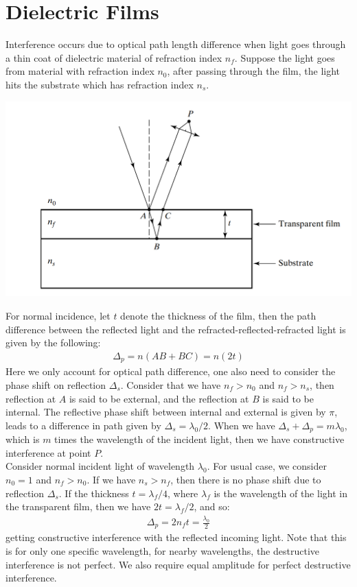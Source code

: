\documentclass[11pt]{book}
\theoremstyle{break}
\theoremstyle{break}
\begin{document}
\section[Dielectric Films]{\color{red}Dielectric Films\color{black}}
Interference occurs due to optical path length difference when light goes through a thin coat of dielectric material of refraction index $n_f$. Suppose the light goes from material with refraction index $n_0$, after passing through the film, the light hits the substrate which has refraction index $n_s$. \\
\begin{center}
\includegraphics[scale=0.39]{film.png}
\end{center}
For normal incidence, let $t$ denote the thickness of the film, then the path difference between the reflected light and the refracted-reflected-refracted light is given by the following:
\begin{align*}
\Delta_p = n(AB+BC) = n(2t)
\end{align*}
Here we only account for optical path difference, one also need to consider the phase shift on reflection $\Delta_s$. Consider that we have $n_f > n_0$ and $n_f > n_s$, then reflection at $A$ is said to be external, and the reflection at $B$ is said to be internal. The reflective phase shift between internal and external is given by $\pi$, leads to a difference in path given by $\Delta_s = \lambda_0/ 2$. When we have $\Delta_s+ \Delta_p = m\lambda_0$, which is $m$ times the wavelength of the incident light, then we have constructive interference at point $P$.\\

Consider normal incident light of wavelength $\lambda_0$. For usual case, we consider $n_0 = 1$ and $n_f > n_0$. If we have $n_s > n_f$, then there is no phase shift due to reflection $\Delta_s$. If the thickness $t=\lambda_f/4$, where $\lambda_f$ is the wavelength of the light in the transparent film, then we have $2t = \lambda_f / 2$, and so:
\begin{align*}
\Delta_p= 2n_ft = \frac{\lambda_0}{2}
\end{align*}
getting constructive interference with the reflected incoming light. Note that this is for only one specific wavelength, for nearby wavelengths, the destructive interference is not perfect. We also require equal amplitude for perfect destructive interference. \\
\end{document}
